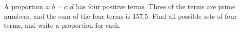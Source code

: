 A proportion $a:b=c:d$ has four positive terms. Three of the terms are prime numbers, and the sum of the four terms is $157.5$. Find all possible sets of four terms, and write a proportion for each.
